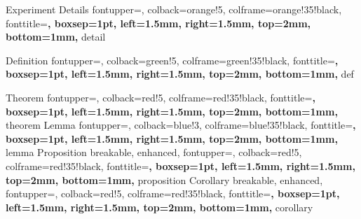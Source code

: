 
  {Experiment Details}%
  {%
    fontupper=\small,
    colback=orange!5,
    colframe=orange!35!black,
    fonttitle=\bfseries,
    boxsep=1pt,
    left=1.5mm,
    right=1.5mm,
    top=2mm,
    bottom=1mm,
  }%
  {detail}%

  {Definition}%
  {%
    fontupper=\small,
    colback=green!5,
    colframe=green!35!black,
    fonttitle=\bfseries,
    boxsep=1pt,
    left=1.5mm,
    right=1.5mm,
    top=2mm,
    bottom=1mm,
  }%
  {def}%

  {Theorem}%
  {%
    fontupper=\small,
    colback=red!5,
    colframe=red!35!black,
    fonttitle=\bfseries,
    boxsep=1pt,
    left=1.5mm,
    right=1.5mm,
    top=2mm,
    bottom=1mm,
  }%
  {theorem}%
  {Lemma}%
  {%
    fontupper=\small,
    colback=blue!3,
    colframe=blue!35!black,
    fonttitle=\bfseries,
    boxsep=1pt,
    left=1.5mm,
    right=1.5mm,
    top=2mm,
    bottom=1mm,
  }%
  {lemma}%
  {Proposition}%
  {%
    breakable,
    enhanced,
    fontupper=\small,
    colback=red!5,
    colframe=red!35!black,
    fonttitle=\bfseries,
    boxsep=1pt,
    left=1.5mm,
    right=1.5mm,
    top=2mm,
    bottom=1mm,
  }%
  {proposition}%
  {Corollary}%
  {%
    breakable,
    enhanced,
    fontupper=\small,
    colback=red!5,
    colframe=red!35!black,
    fonttitle=\bfseries,
    boxsep=1pt,
    left=1.5mm,
    right=1.5mm,
    top=2mm,
    bottom=1mm,
  }%
  {corollary}%
